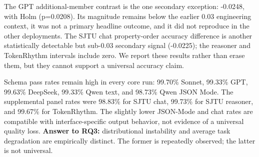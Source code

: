 \documentclass[11pt,a4paper]{article}
\begin{document}
\begin{table}[t]
\caption{Leaf-value accuracy contrasts for the decomposed studies.}
\label{tab:markdown-4}
\centering
{}
\end{table}
The GPT additional-member contrast is the one secondary exception: -0.0248, with Holm (p=0.0208). Its magnitude remains below the earlier 0.03 engineering context, it was not a primary headline outcome, and it did not reproduce in the other deployments. The SJTU chat property-order accuracy difference is another statistically detectable but sub-0.03 secondary signal (-0.0225); the reasoner and TokenRhythm intervals include zero. We report these results rather than erase them, but they cannot support a universal accuracy claim.

Schema pass rates remain high in every core run: 99.70\% Sonnet, 99.33\% GPT, 99.63\% DeepSeek, 99.33\% Qwen text, and 98.73\% Qwen JSON Mode. The supplemental panel rates were 98.83\% for SJTU chat, 99.73\% for SJTU reasoner, and 99.67\% for TokenRhythm. The slightly lower JSON-Mode and chat rates are compatible with interface-specific output behavior, not evidence of a universal quality loss. \textbf{Answer to RQ3:} distributional instability and average task degradation are empirically distinct. The former is repeatedly observed; the latter is not universal.
\end{document}
